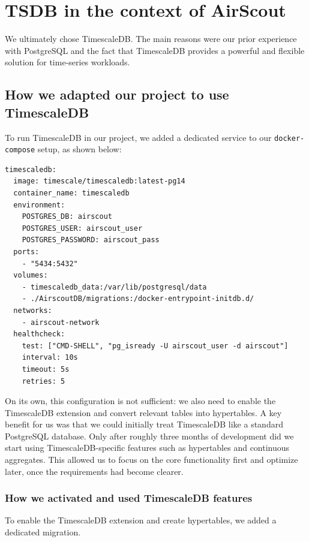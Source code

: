 \section{TSDB in the context of AirScout}

We ultimately chose TimescaleDB\@. The main reasons were our prior experience
with PostgreSQL and the fact that TimescaleDB provides a powerful and flexible
solution for time-series workloads.

\subsection{How we adapted our project to use TimescaleDB}

To run TimescaleDB in our project, we added a dedicated service to our
\texttt{docker-\linebreak compose} setup, as shown below:

\begin{lstlisting}[style=yaml, caption={Docker-compose service definition for TimescaleDB.}, label={lst:docker-timescaledb-conclusion}]
timescaledb:
  image: timescale/timescaledb:latest-pg14
  container_name: timescaledb
  environment:
    POSTGRES_DB: airscout
    POSTGRES_USER: airscout_user
    POSTGRES_PASSWORD: airscout_pass
  ports:
    - "5434:5432"
  volumes:
    - timescaledb_data:/var/lib/postgresql/data
    - ./AirscoutDB/migrations:/docker-entrypoint-initdb.d/
  networks:
    - airscout-network
  healthcheck:
    test: ["CMD-SHELL", "pg_isready -U airscout_user -d airscout"]
    interval: 10s
    timeout: 5s
    retries: 5
\end{lstlisting}

On its own, this configuration is not sufficient: we also need to enable the
TimescaleDB extension and convert relevant tables into hypertables. A key
benefit for us was that we could initially treat TimescaleDB like a standard
PostgreSQL database. Only after roughly three months of development did we
start using TimescaleDB-specific features such as hypertables and continuous
aggregates. This allowed us to focus on the core functionality first and
optimize later, once the requirements had become clearer.

\subsubsection{How we activated and used TimescaleDB features}\label{sec:timescaledb-features}

To enable the TimescaleDB extension and create hypertables, we added a
dedicated migration.

